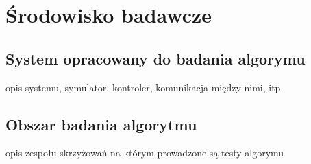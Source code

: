 \chapter{Środowisko badawcze}
\section{System opracowany do badania algorymu}
opis systemu, symulator, kontroler, komunikacja między nimi, itp
\section{Obszar badania algorytmu}
opis zespołu skrzyżowań na którym prowadzone są testy algorymu